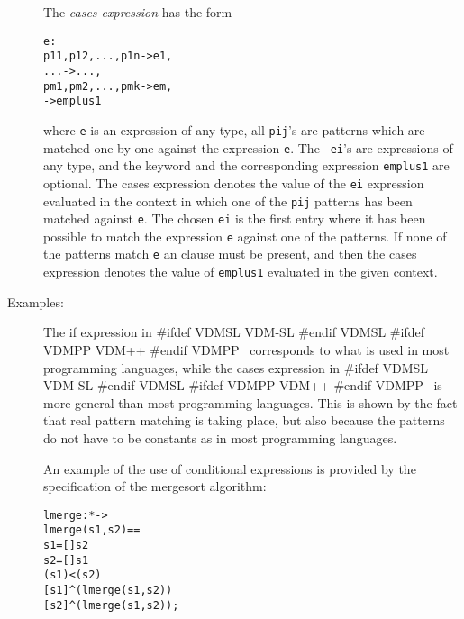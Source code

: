 \documentclass[\pformat,12pt]{article}
\newcommand{\vdmslpp}[2]{%
#ifdef VDMSL
#1
#endif VDMSL
#ifdef VDMPP
#2
#endif VDMPP
}
\newcommand{\vdmsl}{VDM-SL}
\newcommand{\vdmpp}{VDM++}
\begin{document}
\begin{description}
  The {\it cases expression} has the form
  \begin{alltt}
     e :
      p11, p12, ..., p1n -> e1,
      ...                -> ...,
      pm1, pm2, ..., pmk -> em,
                   -> emplus1
  \end{alltt}
  where {\tt e} is an expression of any type, all {\tt pij}'s are patterns
  which are matched one by one against the expression {\tt e}.  The {\tt
    ei}'s are expressions of any type, and the keyword  and
  the corresponding expression {\tt emplus1} are optional. The cases
  expression denotes the value of the {\tt ei} expression evaluated in the
  context in which one of the {\tt pij} patterns has been matched against
  {\tt e}. The chosen {\tt ei} is the first entry where it has been
  possible to match the expression {\tt e} against one of the patterns. If
  none of the patterns match {\tt e} an  clause must be
  present, and then the cases expression denotes the value of {\tt emplus1}
  evaluated in the given context.
     
\item[Examples:] The if expression in \vdmslpp{\vdmsl}{\vdmpp}\ 
  corresponds to what is used in most programming languages, while the
  cases expression in \vdmslpp{\vdmsl}{\vdmpp}\ is more general than
  most programming languages. This is shown by the fact that real
  pattern matching is taking place, but also because the patterns do not
  have to be constants as in most programming languages.

  An example of the use of conditional expressions is provided by the
  specification of the mergesort algorithm:
  \begin{alltt}
  lmerge :  *  -> 
  lmerge (s1,s2) ==
     s1 = []  s2
     s2 = []  s1
    \keyw{elseif} ( s1) < ( s2)
    \keyw{then} [ s1]\verb+^+(lmerge ( s1, s2))
    \keyw{else} [\keyw{hd} s2]\verb+^+(lmerge (s1, \keyw{tl} s2));


\end{alltt}
\end{description}
\end{document}
